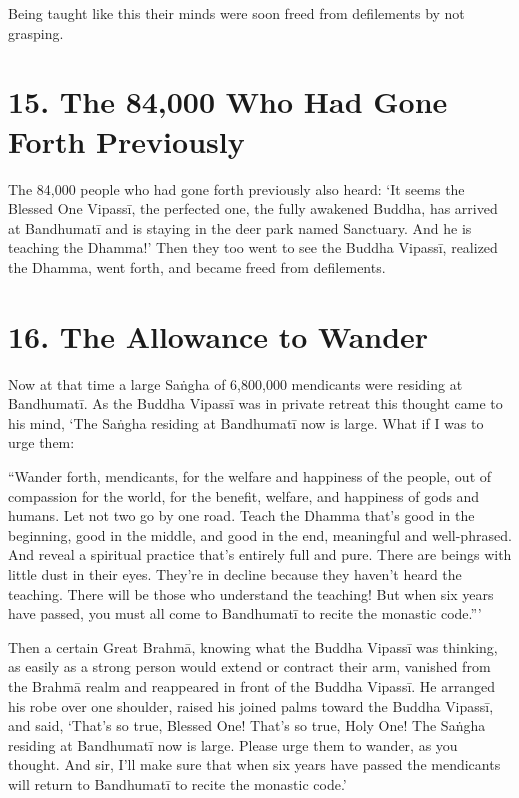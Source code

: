 \documentclass[12pt,openany]{book}%
\begin{document}
Being taught like this their minds were soon freed from defilements by not grasping. 

\section*{15. The 84,000 Who Had Gone Forth Previously }

The 84,000 people who had gone forth previously also heard: ‘It seems the Blessed One \textsanskrit{Vipassī}, the perfected one, the fully awakened Buddha, has arrived at \textsanskrit{Bandhumatī} and is staying in the deer park named Sanctuary. And he is teaching the Dhamma!’ Then they too went to see the Buddha \textsanskrit{Vipassī}, realized the Dhamma, went forth, and became freed from defilements. 

\section*{16. The Allowance to Wander }

Now at that time a large \textsanskrit{Saṅgha} of 6,800,000 mendicants were residing at \textsanskrit{Bandhumatī}. As the Buddha \textsanskrit{Vipassī} was in private retreat this thought came to his mind, ‘The \textsanskrit{Saṅgha} residing at \textsanskrit{Bandhumatī} now is large. What if I was to urge them: 

“Wander forth, mendicants, for the welfare and happiness of the people, out of compassion for the world, for the benefit, welfare, and happiness of gods and humans. Let not two go by one road. Teach the Dhamma that’s good in the beginning, good in the middle, and good in the end, meaningful and well-phrased. And reveal a spiritual practice that’s entirely full and pure. There are beings with little dust in their eyes. They’re in decline because they haven’t heard the teaching. There will be those who understand the teaching! But when six years have passed, you must all come to \textsanskrit{Bandhumatī} to recite the monastic code.”’ 

Then a certain Great \textsanskrit{Brahmā}, knowing what the Buddha \textsanskrit{Vipassī} was thinking, as easily as a strong person would extend or contract their arm, vanished from the \textsanskrit{Brahmā} realm and reappeared in front of the Buddha \textsanskrit{Vipassī}. He arranged his robe over one shoulder, raised his joined palms toward the Buddha \textsanskrit{Vipassī}, and said, ‘That’s so true, Blessed One! That’s so true, Holy One! The \textsanskrit{Saṅgha} residing at \textsanskrit{Bandhumatī} now is large. Please urge them to wander, as you thought. And sir, I’ll make sure that when six years have passed the mendicants will return to \textsanskrit{Bandhumatī} to recite the monastic code.’ 
\end{document}
